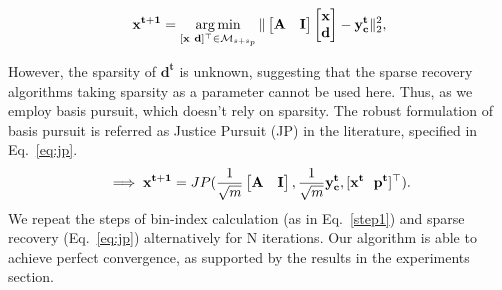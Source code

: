 $$
\mathbf{{x}^{t+1}}=\argmin_{[\mathbf{x~d}]^\t \in \mathcal{M}_{s+s_p}}\norm{\begin{bmatrix} \mathbf{A} & \mathbf{I} \end{bmatrix} \begin{bmatrix} \mathbf{x} \\ \mathbf{d} \end{bmatrix} - \mathbf{y^t_c}}_2^2, %
$$

 However, the sparsity of $\mathbf{d^t}$ is unknown, suggesting that the sparse recovery algorithms taking sparsity as a parameter cannot be used here. Thus, as we employ basis pursuit, which doesn't rely on sparsity. The robust formulation of basis pursuit is referred as Justice Pursuit (JP) \cite{Laska2009} in the literature, specified in Eq.~\ref{eq:jp}.
\begin{equation}
\implies \mathbf{{x^{t+1}}} = JP(\frac{1}{\sqrt{m}}\begin{bmatrix} \mathbf{A} & \mathbf{I} \end{bmatrix},\frac{1}{\sqrt{m}}\mathbf{y^t_c},[\mathbf{x^t~~p^t}]^\top).
\label{eq:jp}
\end{equation}
We repeat the steps of bin-index calculation (as in Eq.~\ref{step1}) and sparse recovery (Eq.~\ref{eq:jp}) alternatively for $\mathrm{N}$ iterations. Our algorithm is able to achieve perfect convergence, as supported by the results in the experiments section.



%
